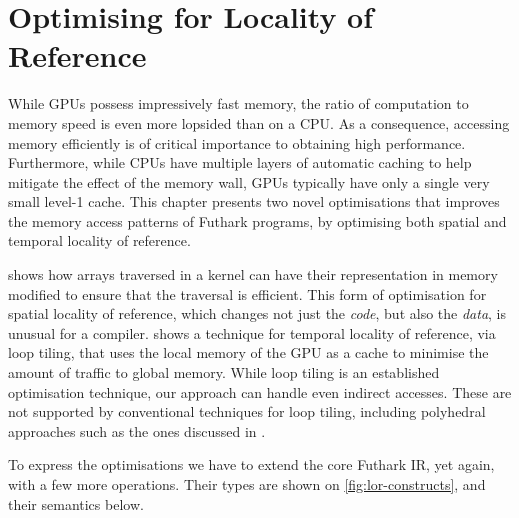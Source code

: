\chapter{Optimising for Locality of Reference}
\label{chap:tiling}

While GPUs possess impressively fast memory, the ratio of computation
to memory speed is even more lopsided than on a CPU.  As a
consequence, accessing memory efficiently is of critical importance to
obtaining high performance.  Furthermore, while CPUs have multiple
layers of automatic caching to help mitigate the effect of the memory
wall, GPUs typically have only a single very small level-1 cache.
This chapter presents two novel optimisations that improves the memory
access patterns of Futhark programs, by optimising both spatial and temporal locality of reference.

 shows how arrays traversed in a kernel
can have their representation in memory modified to ensure that the
traversal is efficient.  This form of optimisation for spatial
locality of reference, which changes not just the \textit{code}, but
also the \textit{data}, is unusual for a compiler.
 shows a technique for temporal locality of
reference, via loop tiling, that uses the local memory of the GPU as a
cache to minimise the amount of traffic to global memory.  While loop
tiling is an established optimisation technique, our approach can
handle even indirect accesses.  These are not supported by
conventional techniques for loop tiling, including polyhedral
approaches such as the ones discussed in
\cite{chatarasi2015polyhedral}.

To express the optimisations we have to extend the core Futhark IR,
yet again, with a few more operations.  Their types are shown on
\cref{fig:lor-constructs}, and their semantics below.

